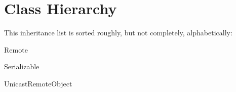 \section{Class Hierarchy}
This inheritance list is sorted roughly, but not completely, alphabetically\+:\begin{DoxyCompactList}
\item {}
\item {}
\item Remote\begin{DoxyCompactList}
\item {}
\begin{DoxyCompactList}
\item {}
\end{DoxyCompactList}
\end{DoxyCompactList}
\item Serializable\begin{DoxyCompactList}
\item {}
\item {}
\item {}
\end{DoxyCompactList}
\item Unicast\+Remote\+Object\begin{DoxyCompactList}
\item {}
\end{DoxyCompactList}
\end{DoxyCompactList}
